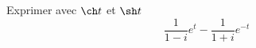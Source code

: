 Exprimer avec $\ch t$ et $\sh t$
\begin{displaymath}
 \frac{1}{1-i}e^{t}-\frac{1}{1+i}e^{-t}
\end{displaymath}
\medskip